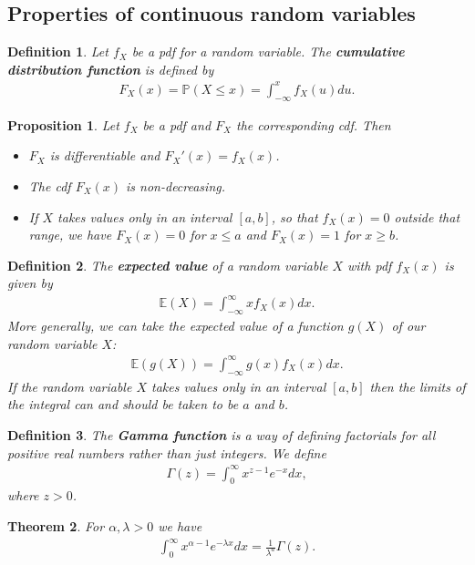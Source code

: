 \documentclass{article}
\theoremstyle{sltheorem}
\newtheorem{definition}{Definition}[section]
\newtheorem{theorem}{Theorem}[section]
\newtheorem{proposition}[theorem]{Proposition}
\renewcommand{\P}{\mathbb{P}}
\newcommand{\E}{\mathbb{E}}
\newcommand*\B[1]{\textbf{#1}}
\begin{document}
\subsection{Properties of continuous random variables}
\begin{definition}
    Let $f_X$ be a pdf for a random variable. The \B{cumulative distribution
    function} is defined by
    \begin{align*}
        F_X(x) = \P(X\leq x) = \int_{-\infty}^x f_X(u)du.
    \end{align*}
\end{definition}
\begin{proposition}
    Let $f_X$ be a pdf and $F_X$ the corresponding cdf. Then
    \begin{itemize}
        \item $F_X$ is differentiable and $F_X'(x) = f_X(x)$.
        \item The cdf $F_X(x)$ is non-decreasing.
        \item If $X$ takes values only in an interval $[a,b]$, so that
              $f_X(x)=0$ outside that range, we have
              $F_X(x)=0$ for $x\leq a$ and $F_X(x)=1$ for $x\geq b$.
    \end{itemize}
\end{proposition}
\begin{definition}
    The \B{expected value} of a random variable $X$ with pdf $f_X(x)$ 
    is given by
    \begin{align*}
        \E(X) = \int_{-\infty}^\infty xf_X(x) dx.
    \end{align*}
    More generally, we can take the expected value of a function 
    $g(X)$ of our random variable $X$:
    \begin{align*}
        \E(g(X)) = \int_{-\infty}^\infty g(x) f_X(x)dx.
    \end{align*}
    If the random variable $X$ takes values only in an interval
    $[a,b]$ then the limits of the integral can and should be taken
    to be $a$ and $b$.
\end{definition}
\begin{definition}
    The \B{Gamma function} is a way of defining factorials for all
    positive real numbers rather than just integers. We define
    \begin{align*}
        \Gamma(z) = \int_0^\infty x^{z-1}e^{-x}dx,
    \end{align*}
    where $z>0$.
\end{definition}
\begin{theorem}
    For $\alpha,\lambda>0$ we have
    \begin{align*}
        \int_0^\infty x^{\alpha -1}e^{-\lambda x} dx = \frac{1}{\lambda^a}\Gamma(z).
    \end{align*}
\end{theorem}
\end{document}
